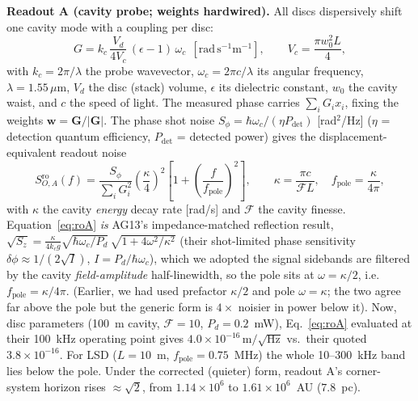\documentclass[11pt]{article}
\begin{document}
\textbf{Readout A (cavity probe; weights hardwired).} All discs
dispersively shift one cavity mode with a coupling per disc:
\begin{equation}
  G = k_c\,\frac{V_d}{4 V_c}\,(\epsilon - 1)\,\omega_c
  \ \ [\mathrm{rad\,s^{-1} m^{-1}}],
  \qquad
  V_c = \frac{\pi w_0^2 L}{4},
  \label{eq:G}
\end{equation}
with $k_c = 2\pi/\lambda$ the probe wavevector, $\omega_c = 2\pi
c/\lambda$ its angular frequency, $\lambda = 1.55\,\mu$m, $V_d$ the
disc (stack) volume, $\epsilon$ its dielectric constant, $w_0$ the
cavity waist, and $c$ the speed of light. The measured phase carries
$\sum_i G_i x_i$, fixing the weights $\mathbf{w} =
\mathbf{G}/|\mathbf{G}|$. The phase shot noise $S_\phi =
\hbar\omega_c/(\eta P_{\det})$ [rad$^2$/Hz] ($\eta$ = detection
quantum efficiency, $P_{\det}$ = detected power) gives the
displacement-equivalent readout noise
\begin{equation}
  S^{\mathrm{ro}}_{O,A}(f) = \frac{S_\phi}{\sum_i G_i^2}
  \left(\frac{\kappa}{4}\right)^{\!2}
  \left[1 + \left(\frac{f}{f_{\mathrm{pole}}}\right)^{\!2}\right],
  \qquad
  \kappa = \frac{\pi c}{\mathcal{F} L},\quad
  f_{\mathrm{pole}} = \frac{\kappa}{4\pi},
  \label{eq:roA}
\end{equation}
with $\kappa$ the cavity \emph{energy} decay rate [rad/s] and
$\mathcal{F}$ the cavity finesse. Equation~\eqref{eq:roA} \emph{is}
AG13's impedance-matched reflection result, $\sqrt{S_z} =
\frac{\kappa}{4 k_c g}\sqrt{\hbar\omega_c/P_d}\,
\sqrt{1+4\omega^2/\kappa^2}$ (their shot-limited phase sensitivity
$\delta\phi \approx 1/(2\sqrt{I})$, $I = P_d/\hbar\omega_c$), which we
adopted the signal sidebands are filtered by the cavity
\emph{field-amplitude} half-linewidth, so the pole sits at $\omega =
\kappa/2$, i.e.\ $f_{\mathrm{pole}} = \kappa/4\pi$. (Earlier,
we had used prefactor $\kappa/2$ and pole
$\omega = \kappa$; the two agree far above the pole but the generic
form is $4\times$ noisier in power below it). Now,
disc parameters (100~m cavity, $\mathcal{F}=10$, $P_d = 0.2$~mW),
Eq.~\eqref{eq:roA} evaluated at their 100~kHz operating point gives
$4.0\times10^{-16}\,\mathrm{m}/\sqrt{\mathrm{Hz}}$ vs.\ their quoted
$3.8\times10^{-16}$. For LSD ($L = 10$~m,
$f_{\mathrm{pole}} = 0.75$~MHz) the whole 10--300~kHz band lies below
the pole. Under the corrected (quieter) form, readout A's corner-system
horizon rises $\approx\sqrt{2}$, from $1.14\times10^{6}$ to
$1.61\times10^{6}$~AU ($7.8$~pc).
\end{document}
